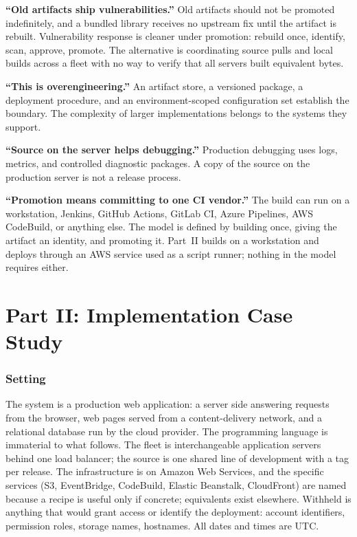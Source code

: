 \documentclass[11pt]{article}
\begin{document}
\textbf{``Old artifacts ship vulnerabilities.''} Old artifacts should not be promoted indefinitely, and a bundled library receives no upstream fix until the artifact is rebuilt. Vulnerability response is cleaner under promotion: rebuild once, identify, scan, approve, promote. The alternative is coordinating source pulls and local builds across a fleet with no way to verify that all servers built equivalent bytes.

\textbf{``This is overengineering.''} An artifact store, a versioned package, a deployment procedure, and an environment-scoped configuration set establish the boundary. The complexity of larger implementations belongs to the systems they support.

\textbf{``Source on the server helps debugging.''} Production debugging uses logs, metrics, and controlled diagnostic packages. A copy of the source on the production server is not a release process.

\textbf{``Promotion means committing to one CI vendor.''} The build can run on a workstation, Jenkins, GitHub Actions, GitLab CI, Azure Pipelines, AWS CodeBuild, or anything else. The model is defined by building once, giving the artifact an identity, and promoting it. Part~II builds on a workstation and deploys through an AWS service used as a script runner; nothing in the model requires either.

\part*{Part II: Implementation Case Study}

\section{Setting}

The system is a production web application: a server side answering requests from the browser, web pages served from a content-delivery network, and a relational database run by the cloud provider. The programming language is immaterial to what follows. The fleet is interchangeable application servers behind one load balancer; the source is one shared line of development with a tag per release. The infrastructure is on Amazon Web Services, and the specific services (S3, EventBridge, CodeBuild, Elastic Beanstalk, CloudFront) are named because a recipe is useful only if concrete; equivalents exist elsewhere. Withheld is anything that would grant access or identify the deployment: account identifiers, permission roles, storage names, hostnames. All dates and times are UTC.
\end{document}
